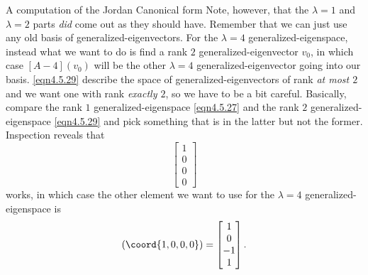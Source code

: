 \begin{exm}{A computation of the Jordan Canonical form}{}
	Note, however, that the $\lambda =1$ and $\lambda =2$ parts \emph{did} come out as they should have.  Remember that we can just use any old basis of generalized-eigenvectors.  For the $\lambda =4$ generalized-eigenspace, instead what we want to do is find a rank $2$ generalized-eigenvector $v_0$, in which case $[A-4](v_0)$ will be the other $\lambda =4$ generalized-eigenvector going into our basis.  \eqref{eqn4.5.29} describe the space of generalized-eigenvectors of rank \emph{at most $2$} and we want one with rank \emph{exactly $2$}, so we have to be a bit careful.  Basically, compare the rank $1$ generalized-eigenspace \eqref{eqn4.5.27} and the rank $2$ generalized-eigenspace \eqref{eqn4.5.29} and pick something that is in the latter but not the former.  Inspection reveals that
	\begin{equation}
		\begin{bmatrix}1 \\ 0 \\ 0 \\ 0\end{bmatrix}
	\end{equation}
	works, in which case the other element we want to use for the $\lambda =4$ generalized-eigenspace is
	\begin{equation}
		[A-4](\coord{1,0,0,0})=\begin{bmatrix}1 \\ 0 \\ -1 \\ 1\end{bmatrix}.
	\end{equation}
	

\end{exm}
